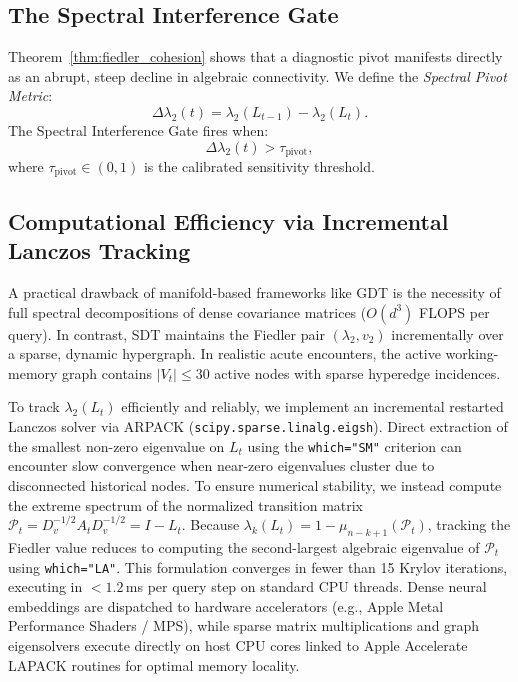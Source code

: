 \documentclass[10pt, onecolumn]{article}
\begin{document}
\subsection{The Spectral Interference Gate}

Theorem~\ref{thm:fiedler_cohesion} shows that a diagnostic pivot manifests directly as an abrupt, steep decline in algebraic connectivity. We define the \emph{Spectral Pivot Metric}:
\begin{equation}
  \Delta \lambda_2(t) = \lambda_2(L_{t-1}) - \lambda_2(L_t).
  \label{eq:delta_lambda2}
\end{equation}
The Spectral Interference Gate fires when:
\begin{equation}
  \boxed{\Delta \lambda_2(t) > \tau_{\text{pivot}},}
  \label{eq:gate_trigger}
\end{equation}
where $\tau_{\text{pivot}} \in (0, 1)$ is the calibrated sensitivity threshold. 

\subsection{Computational Efficiency via Incremental Lanczos Tracking}

A practical drawback of manifold-based frameworks like GDT is the necessity of full spectral decompositions of dense covariance matrices ($O(d^3)$ FLOPS per query). In contrast, SDT maintains the Fiedler pair $(\lambda_2, v_2)$ incrementally over a sparse, dynamic hypergraph. In realistic acute encounters, the active working-memory graph contains $|V_t| \le 30$ active nodes with sparse hyperedge incidences.

To track $\lambda_2(L_t)$ efficiently and reliably, we implement an incremental restarted Lanczos solver via ARPACK (\texttt{scipy.sparse.linalg.eigsh}). Direct extraction of the smallest non-zero eigenvalue on $L_t$ using the \texttt{which="SM"} criterion can encounter slow convergence when near-zero eigenvalues cluster due to disconnected historical nodes. To ensure numerical stability, we instead compute the extreme spectrum of the normalized transition matrix $\mathcal{P}_t = D_v^{-1/2} A_t D_v^{-1/2} = I - L_t$. Because $\lambda_k(L_t) = 1 - \mu_{n-k+1}(\mathcal{P}_t)$, tracking the Fiedler value reduces to computing the second-largest algebraic eigenvalue of $\mathcal{P}_t$ using \texttt{which="LA"}. This formulation converges in fewer than 15 Krylov iterations, executing in $< 1.2$\,ms per query step on standard CPU threads. Dense neural embeddings are dispatched to hardware accelerators (e.g., Apple Metal Performance Shaders / MPS), while sparse matrix multiplications and graph eigensolvers execute directly on host CPU cores linked to Apple Accelerate LAPACK routines for optimal memory locality.
\end{document}
